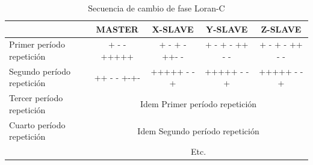 \begin{table}[!h]
  \centering
\caption{Secuencia de cambio de fase Loran-C \protect\cite{Loran1962}}
\label{tab:06.Loran.C.secuencia.cambio.fase}
  \begin{tabular}{lcccc} \hline
  &MASTER &X-SLAVE& Y-SLAVE& Z-SLAVE \\ \hline
Primer per\'iodo repetici\'on &+ - - +++++ &+ - + - ++- - &+ - + - ++ - - &+ - + - ++ - - \\ 
Segundo per\'iodo repetici\'on &++ - - +-+- &+++++ - - + &+++++ - -+ &+++++ - - + \\
Tercer per\'iodo repetici\'on & \multicolumn{4}{c}{Idem Primer per\'iodo repetici\'on}\\
Cuarto per\'iodo repetici\'on & \multicolumn{4}{c}{Idem Segundo per\'iodo repetici\'on}\\
& \multicolumn{4}{c}{Etc.} \\ \hline
\end{tabular}
\end{table}





